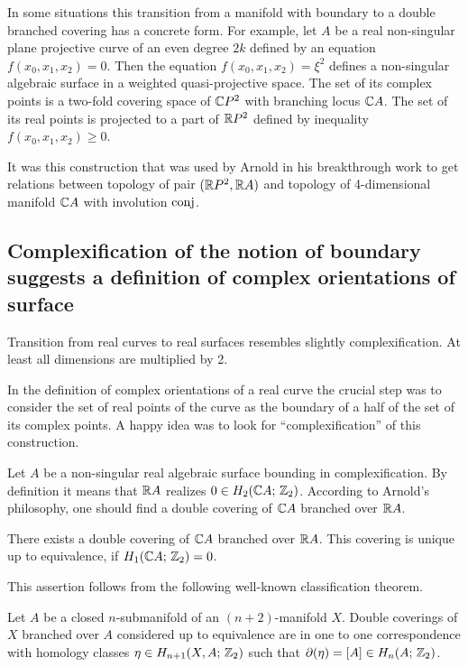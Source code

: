 \documentclass{article}
\numberwithin{equation}{section}
\begin{document}
In some situations this transition from a manifold with boundary to
a double branched covering has a concrete form. For example, let $A$
be a real non-singular plane projective curve of an even degree $2k$
defined by an equation $f(x_0,x_1,x_2)=0$. Then the equation
$f(x_0,x_1,x_2)=\xi^2$ defines a non-singular algebraic surface
in a weighted quasi-projective space. The set of its complex points
is a two-fold covering space of $\mathbb C P^2$ with branching locus $\mathbb C A$.
The set of its real points is projected to a part of $\mathbb R P^2$
defined by inequality $f(x_0,x_1,x_2)\ge0$.

It was this construction that was used by Arnold in his breakthrough
work \cite{A} to get relations between topology of pair $(\mathbb R P^2,\mathbb R A)$
and topology of 4-dimensional manifold $\mathbb C A$ with involution
$\operatorname{conj}$.

\subsection{Complexification of the notion of boundary
suggests a definition of complex orientations of surface}\label{s2.2} 
Transition from real curves to real surfaces resembles slightly
complexification. At least all dimensions are multiplied by 2.

In the definition of complex orientations of a real curve the
crucial step was to consider the set of real points of the curve as
the boundary of a half of the set of its complex points.
A happy idea was to look for ``complexification'' of this
construction.

Let $A$ be a non-singular real algebraic surface bounding in
complexification. By definition it means that $\mathbb R A$ realizes $0\in
H_2(\mathbb C A;\,\mathbb Z_2)$. According to Arnold's philosophy, one should find
a double  covering of $\mathbb C A$ branched  over $\mathbb R A$.

\begin{thm}\label{2.2.A}
 There exists a double  covering of $\mathbb C A$
branched  over $\mathbb R A$. This covering is unique up to
equivalence, if $H_1(\mathbb C A;\,\mathbb Z_2)=0$. 
\end{thm}

This assertion follows from the following well-known classification
theorem.

\begin{thm}\label{2.2.B}
 Let $A$ be a closed $n$-submanifold of an
$(n+2)$-manifold $X$. Double coverings of $X$ branched over $A$
considered up to equivalence are in one to one correspondence with
homology classes $\eta\in H_{n+1}(X,A;\,\mathbb Z_2)$ such that
$\partial(\eta)=[A]\in H_n(A;\,\mathbb Z_2)$. 
\end{thm}
\end{document}
